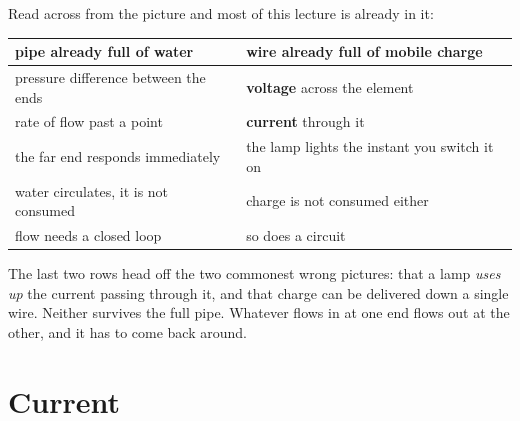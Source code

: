\documentclass[11pt,a4paper]{article}
\begin{document}
\begin{center}
\end{center}
\vspace{2pt}

Read across from the picture and most of this lecture is already in it:

\begin{center}
\small
\begin{tabular}{@{}l l@{}}
\toprule
\textbf{pipe already full of water} & \textbf{wire already full of mobile charge}\\
\midrule
pressure difference between the ends & \textbf{voltage} across the element\\
rate of flow past a point & \textbf{current} through it\\
the far end responds immediately & the lamp lights the instant you switch it on\\
water circulates, it is not consumed & charge is not consumed either\\
flow needs a closed loop & so does a circuit\\
\bottomrule
\end{tabular}
\end{center}
\vspace{4pt}

The last two rows head off the two commonest wrong pictures: that a lamp \emph{uses up}
the current passing through it, and that charge can be delivered down a single wire.
Neither survives the full pipe. Whatever flows in at one end flows out at the other, and
it has to come back around.

\section{Current}
\end{document}
